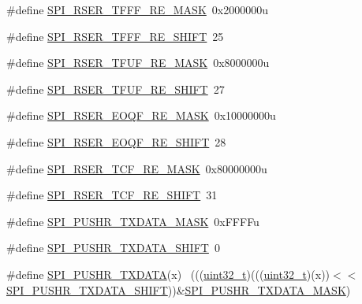 \begin{DoxyCompactItemize}
\#define \hyperlink{group___s_p_i___register___masks_ga1bb1c8b3d77e69e8ea3197b2a26392cb}{S\+P\+I\+\_\+\+R\+S\+E\+R\+\_\+\+T\+F\+F\+F\+\_\+\+R\+E\+\_\+\+M\+A\+SK}~0x2000000u
\item 
\#define \hyperlink{group___s_p_i___register___masks_ga6b7e6d97146fb2244a8b1fb870cf980b}{S\+P\+I\+\_\+\+R\+S\+E\+R\+\_\+\+T\+F\+F\+F\+\_\+\+R\+E\+\_\+\+S\+H\+I\+FT}~25
\item 
\#define \hyperlink{group___s_p_i___register___masks_ga245d7987838cad9b4392b051fbd6fb06}{S\+P\+I\+\_\+\+R\+S\+E\+R\+\_\+\+T\+F\+U\+F\+\_\+\+R\+E\+\_\+\+M\+A\+SK}~0x8000000u
\item 
\#define \hyperlink{group___s_p_i___register___masks_ga42ef57e6e872c54f15ba9742f98ea522}{S\+P\+I\+\_\+\+R\+S\+E\+R\+\_\+\+T\+F\+U\+F\+\_\+\+R\+E\+\_\+\+S\+H\+I\+FT}~27
\item 
\#define \hyperlink{group___s_p_i___register___masks_ga41b148811704b6e9903262dbd1d72433}{S\+P\+I\+\_\+\+R\+S\+E\+R\+\_\+\+E\+O\+Q\+F\+\_\+\+R\+E\+\_\+\+M\+A\+SK}~0x10000000u
\item 
\#define \hyperlink{group___s_p_i___register___masks_ga93b9a7fbf5962c0e407879c781779ac4}{S\+P\+I\+\_\+\+R\+S\+E\+R\+\_\+\+E\+O\+Q\+F\+\_\+\+R\+E\+\_\+\+S\+H\+I\+FT}~28
\item 
\#define \hyperlink{group___s_p_i___register___masks_ga51ba97f1d47ebd36d19c5a634ce96873}{S\+P\+I\+\_\+\+R\+S\+E\+R\+\_\+\+T\+C\+F\+\_\+\+R\+E\+\_\+\+M\+A\+SK}~0x80000000u
\item 
\#define \hyperlink{group___s_p_i___register___masks_ga51740ce9a6d3a38cf50cb1f19af3d002}{S\+P\+I\+\_\+\+R\+S\+E\+R\+\_\+\+T\+C\+F\+\_\+\+R\+E\+\_\+\+S\+H\+I\+FT}~31
\item 
\#define \hyperlink{group___s_p_i___register___masks_gac3651a6adad71c41138f88336e7711b4}{S\+P\+I\+\_\+\+P\+U\+S\+H\+R\+\_\+\+T\+X\+D\+A\+T\+A\+\_\+\+M\+A\+SK}~0x\+F\+F\+F\+Fu
\item 
\#define \hyperlink{group___s_p_i___register___masks_gac9778e35b8039b1268b42e16066a7812}{S\+P\+I\+\_\+\+P\+U\+S\+H\+R\+\_\+\+T\+X\+D\+A\+T\+A\+\_\+\+S\+H\+I\+FT}~0
\item 
\#define \hyperlink{group___s_p_i___register___masks_ga23aa2da43f4aec186aac35f443cce852}{S\+P\+I\+\_\+\+P\+U\+S\+H\+R\+\_\+\+T\+X\+D\+A\+TA}(x)                                        ~(((\hyperlink{_p_e___types_8h_a33594304e786b158f3fb30289278f5af}{uint32\+\_\+t})(((\hyperlink{_p_e___types_8h_a33594304e786b158f3fb30289278f5af}{uint32\+\_\+t})(x))$<$$<$\hyperlink{group___s_p_i___register___masks_gac9778e35b8039b1268b42e16066a7812}{S\+P\+I\+\_\+\+P\+U\+S\+H\+R\+\_\+\+T\+X\+D\+A\+T\+A\+\_\+\+S\+H\+I\+FT}))\&\hyperlink{group___s_p_i___register___masks_gac3651a6adad71c41138f88336e7711b4}{S\+P\+I\+\_\+\+P\+U\+S\+H\+R\+\_\+\+T\+X\+D\+A\+T\+A\+\_\+\+M\+A\+SK})
$$
\end{DoxyCompactItemize}
